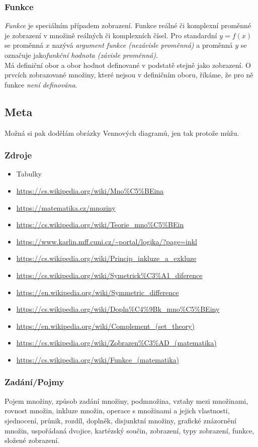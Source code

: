 \documentclass[12pt]{article}
\begin{document}
\subsubsection{Funkce}
\emph{Funkce} je speciálním případem zobrazení. Funkce reálné či komplexní proměnné je zobrazení v množině reálných či komplexních čísel. Pro standardní $y = f(x) $ se proměnná $x$ nazývá \emph{argument funkce (nezávisle proměnná)} a proměnná $y$ se označuje jako\emph{funkční hodnota (závisle proměnná)}.\\
Má definiční obor a obor hodnot definované v podstatě stejně jako zobrazení. O prvcích zobrazované množiny, které nejsou v definičním oboru, říkáme, že pro ně funkce \emph{není definována}.
\subsection{Meta}
Možná si pak dodělám obrázky Vennových diagramů, jen tak protože můžu.
\subsubsection{Zdroje}
\begin{itemize}
\item Tabulky
\item \url{https://cs.wikipedia.org/wiki/Mno\%C5\%BEina}
\item \url{https://matematika.cz/mnoziny}
\item \url{https://cs.wikipedia.org/wiki/Teorie_mno\%C5\%BEin}
\item \url{https://www.karlin.mff.cuni.cz/~portal/logika/?page=inkl}
\item \url{https://cs.wikipedia.org/wiki/Princip_inkluze_a_exkluze}
\item \url{https://cs.wikipedia.org/wiki/Symetrick\%C3\%A1_diference}
\item \url{https://en.wikipedia.org/wiki/Symmetric_difference}
\item \url{https://cs.wikipedia.org/wiki/Dopln\%C4\%9Bk_mno\%C5\%BEiny}
\item \url{https://en.wikipedia.org/wiki/Complement_(set_theory)}
\item \url{https://cs.wikipedia.org/wiki/Zobrazen\%C3\%AD_(matematika)}
\item \url{https://cs.wikipedia.org/wiki/Funkce_(matematika)}
\end{itemize}
\subsubsection{Zadání/Pojmy}
Pojem množiny, způsob zadání množiny, podmnožina, vztahy mezi množinami, rovnost množin, inkluze množin, operace s množinami a jejich vlastnosti, sjednocení, průnik, rozdíl, doplněk, disjunktní množiny, grafické znázornění množin, uspořádaná dvojice, kartézský součin, zobrazení, typy zobrazení, funkce, složené zobrazení.
\end{document}
